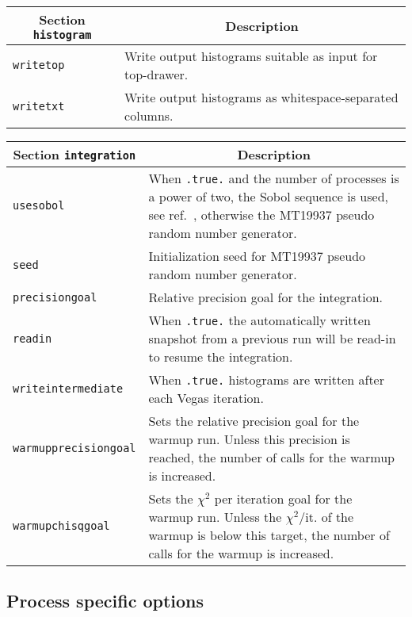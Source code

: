 	\begin{longtable}{p{1.5cm}p{12cm}}
		\toprule
		\multicolumn{1}{c}{{\textbf{Section} \texttt{histogram}}} & \multicolumn{1}{c}{{\textbf{Description}}} \\ 
		\midrule
		\texttt{writetop} & Write output histograms suitable as input for top-drawer. \\
		\texttt{writetxt} & Write output histograms as whitespace-separated columns. \\
		\bottomrule
	\end{longtable}

	\begin{longtable}{p{1.5cm}p{12cm}}
		\toprule
		\multicolumn{1}{c}{{\textbf{Section} \texttt{integration}}} & \multicolumn{1}{c}{{\textbf{Description}}} \\ 
		\midrule
		\texttt{usesobol} & When \texttt{.true.} and the number of \MPI{} processes is a power of two, the Sobol 
		sequence is used, see ref.~\cite{MCFM9}, otherwise the {\abbrev MT19937} pseudo random number generator. \\
		\texttt{seed} & Initialization seed for {\abbrev MT19937} pseudo random number generator. \\
		\texttt{precisiongoal} & Relative precision goal for the integration. \\
		\texttt{readin} & When \texttt{.true.} the automatically written snapshot from a previous run will be read-in
		to resume the integration. \\
		\texttt{writeintermediate} & When \texttt{.true.} histograms are written after each Vegas iteration. \\
		\texttt{warmupprecisiongoal} & Sets the relative precision goal for the warmup run. Unless this precision
		is reached, the number of calls for the warmup is increased. \\
		\texttt{warmupchisqgoal} & Sets the $\chi^2$ per iteration goal for the warmup run. Unless the 
		$\chi^2/\text{it.}$ of the warmup is below this target, the number of calls for the warmup is increased. \\
		\bottomrule
	\end{longtable}

\clearpage

\subsection{Process specific options}

